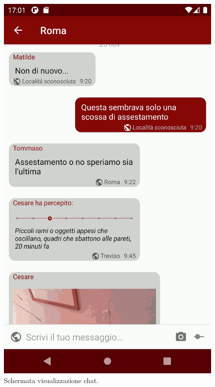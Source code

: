 \begin{figure}[p]
\begin{minipage}{0.45\linewidth}
\includegraphics[width=0.85\linewidth]{assets/02/chat.png}
\caption{Schermata visualizzazione chat.}
\label{fig:android_chat}
\end{minipage}

\end{figure}


